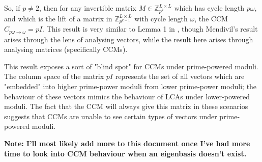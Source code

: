 \documentclass[a4paper, 12pt, reqno]{amsart}
\begin{document}
	So, if $p \neq 2$, then for any invertible matrix $M \in \mathds{Z}_{p^{k}}^{L \times L}$ which has cycle length $p\omega$, and which is the lift of a matrix in 
	$\mathds{Z}_{p^{k-1}}^{L \times L}$ with cycle length $\omega$, the CCM $C_{p\omega \rightarrow \omega} = pI$. This result is very similar to Lemma 1 in 
	\citet{Mendivil2012}, though Mendivil's result arises through the lens of analysing vectors, while the result here arises through analysing matrices (specifically CCMs).
	
	This result exposes a sort of "blind spot" for CCMs under prime-powered moduli. The column space of the matrix $pI$ represents the set of all vectors which are 
	"embedded" into higher prime-power moduli from lower prime-power moduli; the behaviour of these vectors mimics the behaviour of LCAs under lower-powered moduli. The
	fact that the CCM will always give this matrix in these scenarios suggests that CCMs are unable to see certain types of vectors under prime-powered moduli.
	
	\textbf{Note: I'll most likely add more to this document once I've had more time to look into CCM behaviour when an eigenbasis doesn't exist.}
	
	
	
	
\end{document}
